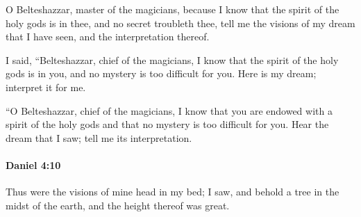			\begin{versebox}
					\item[BHS] 
					\item[LXX] 
					\item[ASV] O Belteshazzar, master of the magicians, because I know that the spirit of the holy gods is in thee, and no secret troubleth thee, tell me the visions of my dream that I have seen, and the interpretation thereof.
					\item[NIV] I said, “Belteshazzar, chief of the magicians, I know that the spirit of the holy gods is in you, and no mystery is too difficult for you. Here is my dream; interpret it for me.
					\item[NRSV] “O Belteshazzar, chief of the magicians, I know that you are endowed with a spirit of the holy gods and that no mystery is too difficult for you. Hear the dream that I saw; tell me its interpretation.
			\end{versebox}

		\paragraph{Daniel 4:10} %
			\label{DANIEL-4-10}

			Thus were the visions of mine head in my bed; I saw, and behold a tree in the midst of the earth, and the height thereof was great.

